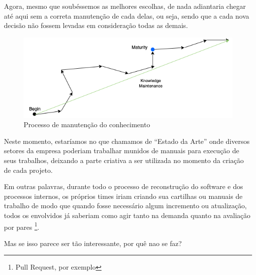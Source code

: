Agora, mesmo que soubéssemos as melhores escolhas, de nada adiantaria chegar até aqui sem a correta manutenção de cada delas, ou seja, sendo que a cada nova decisão não fossem levadas em consideração todas as demais.

\begin{figure}[H]
    \centering
    \includegraphics[scale=0.60,keepaspectratio=true]{images/04.png}
    \caption{Processo de manutenção do conhecimento}
    \label{knowledge_maintenance}
\end{figure}

Neste momento, estaríamos no que chamamos de ``Estado da Arte'' onde diversos setores da empresa poderiam trabalhar munidos de manuais para execução de seus trabalhos, deixando a parte criativa a ser utilizada no momento da criação de cada projeto. 

Em outras palavras, durante todo o processo de reconstrução do software e dos processos internos, os próprios times iriam criando sua cartilhas ou manuais de trabalho de modo que quando fosse necessário algum incremento ou atualização, todos os envolvidos já saberiam como agir tanto na demanda quanto na avaliação por pares \footnote{Pull Request, por exemplo}.

Mas se isso parece ser tão interessante, por quê nao se faz?